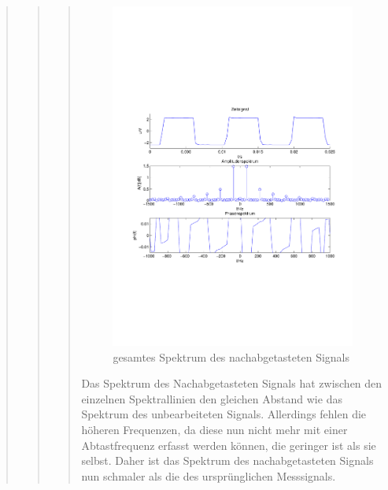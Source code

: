 \begin{quote}
\begin{quote}
\begin{quote}
            \begin{figure}[H]
            \centering
                \includegraphics[scale=0.7, trim = 1.5cm 6.5cm 1cm 7.5cm,
                clip]{./Bilder/rechteck_100Hz_15kHz_3kHz_nachabgetastet_keine_frequenzbegrenzung.pdf}
                    \caption{gesamtes Spektrum des nachabgetasteten Signals}
            \end{figure}
        
            Das Spektrum des Nachabgetasteten Signals hat zwischen den einzelnen Spektrallinien den gleichen Abstand wie das Spektrum des 
            unbearbeiteten Signals. Allerdings fehlen die höheren Frequenzen, da diese nun nicht mehr mit einer Abtastfrequenz erfasst werden 
            können, die geringer ist als sie selbst. Daher ist das Spektrum des nachabgetasteten Signals nun schmaler als die des ursprünglichen 
            Messsignals.\\
        

\end{quote}
\end{quote}
\end{quote}
